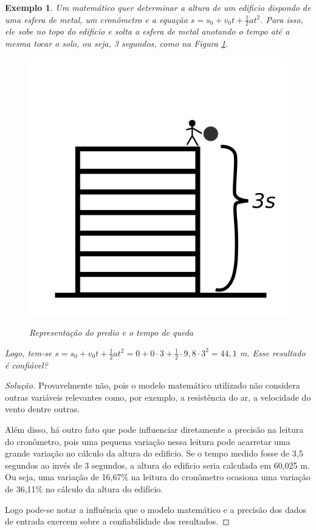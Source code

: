 \documentclass[
	12pt,				%
	openright,			%
	twoside,			%
	a4paper,			%
	english,			%
	french,				%
	brazil,				%
	sumario=tradicional
]{abntex2}
\newtheorem{example}{Exemplo}
\newenvironment{solution}{
	\begin{proof}[Solução]
}{\end{proof}}
\numberwithin{example}{chapter}
\numberwithin{remark}{chapter}
\numberwithin{definition}{chapter}
\numberwithin{figure}{chapter}
\begin{document}
\begin{example}
	Um matemático quer determinar a altura de um edificio dispondo de uma esfera de metal, um cronômetro e a equação $s=s_0+v_0 t+ \frac{1}{2}at^2$. Para isso, ele sobe no topo do edificio e solta a esfera de metal anotando o tempo até a mesma tocar o solo, ou seja, 3 segundos, como na Figura \ref{fig:representacao_predio_queda}.
	
	\begin{figure}[h]
		\centering
		\caption{Representação do predio e o tempo de queda}
		\includegraphics[scale=0.15]{figuras/figura_002}
		\label{fig:representacao_predio_queda}
	\end{figure}
	
	Logo, tem-se $s=s_0+v_0 t+\frac{1}{2}at^2=0+0\cdot 3 + \frac{1}{2}\cdot 9,8 \cdot 3^2=44,1$ m. Esse resultado é confiável?
\end{example}

\begin{solution}	
	Provavelmente não, pois o modelo matemático utilizado não considera outras variáveis relevantes como, por exemplo, a resistência do ar, a velocidade do vento dentre outras.
	
	Além disso, há outro fato que pode influenciar diretamente a precisão na leitura do cronômetro, pois uma pequena variação nessa leitura pode acarretar uma grande variação no cálculo da altura do edificio. Se o tempo medido fosse de 3,5 segundos ao invés de 3 segundos, a altura do edificio seria calculada em 60,025 m. Ou seja, uma variação de 16,67\% na leitura do cronômetro ocasiona uma variação de 36,11\% no cálculo da altura do edifício.
	
	Logo pode-se notar a influência que o modelo matemático e a precisão dos dados de entrada exercem sobre a confiabilidade dos resultados.
\end{solution}
\end{document}
